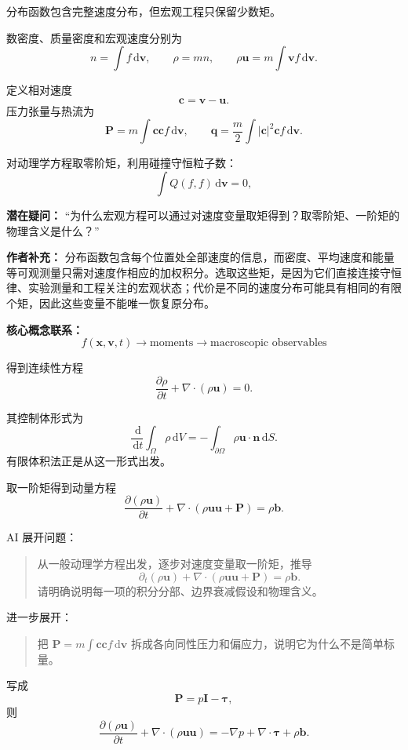 \documentclass[11pt,openany]{ctexbook}
\newcommand{\dd}{\,\mathrm d}
\begin{document}
分布函数包含完整速度分布，但宏观工程只保留少数矩。

数密度、质量密度和宏观速度分别为
\[
n=\int f\dd\bm v,
\qquad
\rho=mn,
\qquad
\rho\bm u=m\int \bm v f\dd\bm v.
\]

定义相对速度
\[
\bm c=\bm v-\bm u.
\]
压力张量与热流为
\[
\bm P=m\int \bm c\bm c f\dd\bm v,
\qquad
\bm q=\frac{m}{2}\int |\bm c|^2\bm c f\dd\bm v.
\]

对动理学方程取零阶矩，利用碰撞守恒粒子数：
\[
\int Q(f,f)\dd\bm v=0,
\]

\begin{authornote}
\textbf{潜在疑问：}
“为什么宏观方程可以通过对速度变量取矩得到？取零阶矩、一阶矩的物理含义是什么？”

\textbf{作者补充：}
分布函数包含每个位置处全部速度的信息，而密度、平均速度和能量等可观测量只需对速度作相应的加权积分。选取这些矩，是因为它们直接连接守恒律、实验测量和工程关注的宏观状态；代价是不同的速度分布可能具有相同的有限个矩，因此这些变量不能唯一恢复原分布。

\textbf{核心概念联系：}
\[
f(\bm x,\bm v,t)
\longrightarrow
\text{moments}
\longrightarrow
\text{macroscopic observables}
\]
\end{authornote}

得到连续性方程
\[
\boxed{
\frac{\partial\rho}{\partial t}
+\nabla\cdot(\rho\bm u)=0
}.
\]

其控制体形式为
\[
\frac{\dd}{\dd t}\int_\Omega \rho\dd V
=
-\int_{\partial\Omega}\rho\bm u\cdot\bm n\dd S.
\]
有限体积法正是从这一形式出发。

取一阶矩得到动量方程
\[
\frac{\partial(\rho\bm u)}{\partial t}
+
\nabla\cdot(\rho\bm u\bm u+\bm P)
=
\rho\bm b.
\]

\begin{askai}
AI 展开问题：
\begin{quote}
从一般动理学方程出发，逐步对速度变量取一阶矩，推导
\[
\partial_t(\rho\bm u)+\nabla\cdot(\rho\bm u\bm u+\bm P)=\rho\bm b.
\]
请明确说明每一项的积分分部、边界衰减假设和物理含义。
\end{quote}

进一步展开：
\begin{quote}
把 \(\bm P=m\int \bm c\bm c f\dd\bm v\) 拆成各向同性压力和偏应力，说明它为什么不是简单标量。
\end{quote}
\end{askai}

写成
\[
\bm P=p\bm I-\bm\tau,
\]
则
\[
\frac{\partial(\rho\bm u)}{\partial t}
+
\nabla\cdot(\rho\bm u\bm u)
=
-\nabla p+\nabla\cdot\bm\tau+\rho\bm b.
\]
\end{document}
